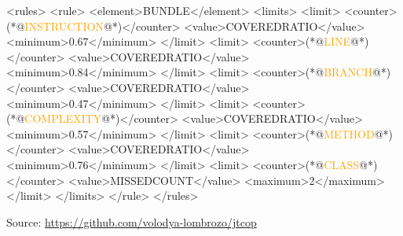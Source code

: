 \documentclass{article}
\begin{document}
\begin{multicols}{2}
{\tiny\begin{ffcode}
<rules>
  <rule>
    <element>BUNDLE</element>
    <limits>
      <limit>
        <counter>(*@\textcolor{orange}{INSTRUCTION}@*)</counter>
        <value>COVEREDRATIO</value>
        <minimum>0.67</minimum>
      </limit>
      <limit>
        <counter>(*@\textcolor{orange}{LINE}@*)</counter>
        <value>COVEREDRATIO</value>
        <minimum>0.84</minimum>
      </limit>
      <limit>
        <counter>(*@\textcolor{orange}{BRANCH}@*)</counter>
        <value>COVEREDRATIO</value>
        <minimum>0.47</minimum>
      </limit>
      <limit>
        <counter>(*@\textcolor{orange}{COMPLEXITY}@*)</counter>
        <value>COVEREDRATIO</value>
        <minimum>0.57</minimum>
      </limit>
      <limit>
        <counter>(*@\textcolor{orange}{METHOD}@*)</counter>
        <value>COVEREDRATIO</value>
        <minimum>0.76</minimum>
      </limit>
      <limit>
        <counter>(*@\textcolor{orange}{CLASS}@*)</counter>
        <value>MISSEDCOUNT</value>
        <maximum>2</maximum>
      </limit>
    </limits>
  </rule>
</rules>
\end{ffcode}
}
\end{multicols}
{\scriptsize Source: \url{https://github.com/volodya-lombrozo/jtcop}\par}
\plush{}


\end{document}

